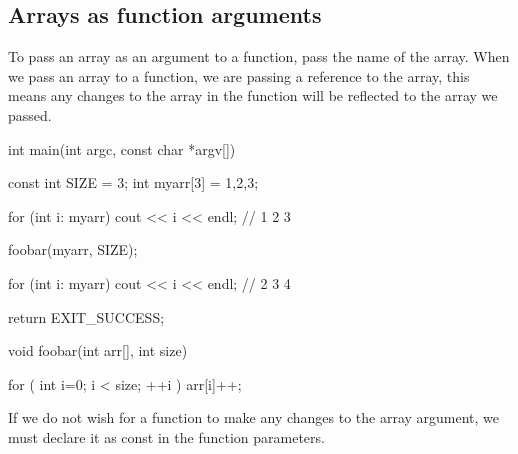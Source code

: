 \documentclass{report}
\begin{document}
    \bigbreak \noindent 

    \bigbreak \noindent 
    \subsection{Arrays as function arguments}
    \bigbreak \noindent 
    \begin{concept}
  To pass an array as an argument to a function, pass the name of the array. When we pass an array to a function, we are passing a reference to the array, this means any changes to the array in the function will be reflected to the array we passed.
	\end{concept}
    \bigbreak \noindent 
    
    \begin{cppcode}
int main(int argc, const char *argv[]) {

    const int SIZE = 3;
    int myarr[3] = {1,2,3};

    for (int i: myarr) cout << i << endl; // 1 2 3

    foobar(myarr, SIZE);

    for (int i: myarr) cout << i << endl; // 2 3 4



    return EXIT_SUCCESS;
}

void foobar(int arr[], int size) {

    for ( int i=0; i < size; ++i ) {
        arr[i]++;
    }


}
    \end{cppcode}
    

    \bigbreak \noindent 
    \begin{notebox}
			If we do not wish for a function to make any changes to the array argument, we must declare it as const in the function parameters.
		\end{notebox}

    \pagebreak
\end{document}
